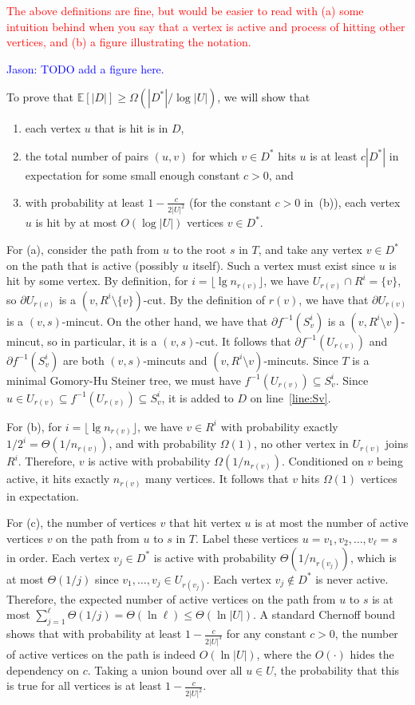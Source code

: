 \documentclass{article}
\newcommand{\f}{\frac}
\newcommand{\cd}{\cdot}
\newcommand{\lds}{\ldots}
\newcommand{\sm}{\setminus}
\newcommand{\s}{\subseteq}
\newcommand{\BE}{\begin{enumerate}}
\newcommand{\EE}{\end{enumerate}}
\newcommand{\im}{\item}
\newcommand{\inv}{^{-1}}
\newcommand{\pt}{\partial}
\newcommand{\Om}{\Omega}
\newcommand{\el}{\ell}
\newcommand{\Th}{\Theta}
\newcommand{\lf}{\lfloor}
\newcommand{\rf}{\rfloor}
\newcommand{\E}{\mathbb E}
\newcommand{\1}{\mathbbm 1}
\newcommand{\alert}{\textcolor{red}}
\renewcommand{\line}[1]{line~\ref{line:#1}}
\begin{document}
\alert{The above definitions are fine, but would be easier to read with (a) some intuition behind when you say that a vertex is active and process of hitting other vertices, and (b) a figure illustrating the notation.}

\textcolor{blue}{Jason: TODO add a figure here.}


To prove that $\E[|D|] \ge \Om(|D^*|/\log|U|)$, we will show that
 \BE
 \im[(a)] each vertex $u$ that is hit is in $D$, 
 \im[(b)] the total number of pairs $(u,v)$ for which $v\in D^*$ hits $u$ is at least $c |D^*|$ in expectation for some small enough constant $c>0$, and
 \im[(c)] with probability at least $1-\f c{2|U|^2}$ (for the constant $c>0$ in~(b)), each vertex $u$ is hit by at most $O(\log|U|)$ vertices $v\in D^*$. %
 \EE

For (a), consider the path from $u$ to the root $s$ in $T$, and take any vertex $v\in D^*$ on the path that is active (possibly $u$ itself). Such a vertex must exist since $u$ is hit by some vertex. By definition, for $i=\lf\lg n_{r(v)}\rf$, we have $U_{r(v)}\cap R^i=\{v\}$, so $\pt U_{r(v)}$ is a $(v,R^i\sm \{v\})$-cut.  By the definition of $r(v)$, we have that $\pt U_{r(v)}$ is a $(v,s)$-mincut. On the other hand, we have that $\pt f\inv(S^i_v)$ is a $(v,R^i\sm v)$-mincut, so in particular, it is a $(v,s)$-cut. It follows that $\pt f\inv(U_{r(v)})$ and $\pt f\inv(S^i_v)$ are both $(v,s)$-mincuts and $(v,R^i\sm v)$-mincuts. Since $T$ is a minimal Gomory-Hu Steiner tree, we must have $f\inv(U_{r(v)}) \s S^i_v$. Since $u\in U_{r(v)}\s f\inv(U_{r(v)})\s S^i_v$, it is added to $D$ on \line{Sv}. 

For (b), for $i=\lf\lg n_{r(v)}\rf$, we have $v\in R^i$ with probability exactly $1/2^i = \Th(1/n_{r(v)})$, and with probability $\Om(1)$, no other vertex in $U_{r(v)}$ joins $R^i$. Therefore, $v$ is active with probability $\Om(1/n_{r(v)})$. Conditioned on $v$ being active, it hits exactly $n_{r(v)}$ many vertices. It follows that $v$ hits $\Om(1)$ vertices in expectation.

For (c), the number of vertices $v$ that hit vertex $u$ is at most the number of active vertices $v$ on the path from $u$ to $s$ in $T$. Label these vertices $u=v_1,v_2,\lds,v_\el=s$ in order. Each vertex $v_j\in D^*$ is active with probability $\Th(1/n_{r(v_j)})$, which is at most $\Th(1/j)$ since $v_1,\lds,v_j \in U_{r(v_j)}$. Each vertex $v_j\notin D^*$ is never active. Therefore, the expected number of active vertices on the path from $u$ to $s$ is at most $\sum_{j=1}^\el\Th(1/j)=\Th(\ln\el)\le \Th(\ln|U|)$. A standard Chernoff bound shows that with probability at least $1-\f c{2|U|^3}$ for any constant $c>0$, the number of active vertices on the path is indeed $O(\ln|U|)$, where the $O(\cd)$ hides the dependency on $c$. Taking a union bound over all $u\in U$, the probability that this is true for all vertices is at least $1-\f c{2|U|^2}$.
\end{document}
